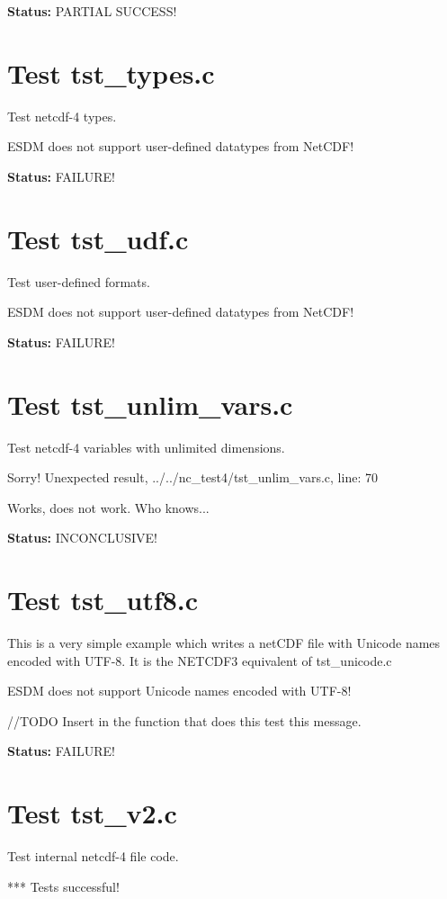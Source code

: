 {\bf \large Status: } PARTIAL SUCCESS!

\section{Test tst\_types.c}

Test netcdf-4 types.

ESDM does not support user-defined datatypes from NetCDF!

{\bf \large Status: } FAILURE!

\section{Test tst\_udf.c}

Test user-defined formats.

ESDM does not support user-defined datatypes from NetCDF!

{\bf \large Status: } FAILURE!

\section{Test tst\_unlim\_vars.c}

Test netcdf-4 variables with unlimited dimensions.

Sorry! Unexpected result, ../../nc\_test4/tst\_unlim\_vars.c, line: 70

Works, does not work. Who knows...

{\bf \large Status: } INCONCLUSIVE!

\section{Test tst\_utf8.c}

This is a very simple example which writes a netCDF file with Unicode names encoded with UTF-8. It is the NETCDF3 equivalent of tst\_unicode.c

ESDM does not support Unicode names encoded with UTF-8!

//TODO Insert in the function that does this test this message.

{\bf \large Status: } FAILURE!

\section{Test tst\_v2.c}

Test internal netcdf-4 file code.

*** Tests successful!

